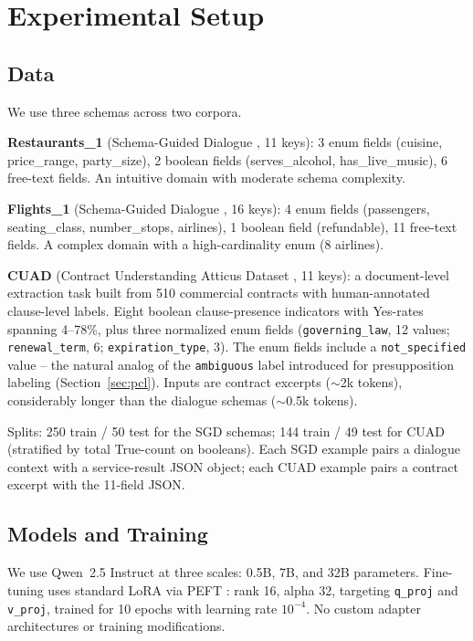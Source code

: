 \documentclass{article}
\begin{document}
\section{Experimental Setup}

\subsection{Data}

We use three schemas across two corpora.

\textbf{Restaurants\_1} (Schema-Guided Dialogue \cite{rastogi2020sgd}, 11 keys): 3 enum fields (cuisine, price\_range, party\_size), 2 boolean fields (serves\_alcohol, has\_live\_music), 6 free-text fields. An intuitive domain with moderate schema complexity.

\textbf{Flights\_1} (Schema-Guided Dialogue \cite{rastogi2020sgd}, 16 keys): 4 enum fields (passengers, seating\_class, number\_stops, airlines), 1 boolean field (refundable), 11 free-text fields. A complex domain with a high-cardinality enum (8 airlines).

\textbf{CUAD} (Contract Understanding Atticus Dataset \cite{hendrycks2021cuad}, 11 keys): a document-level extraction task built from 510 commercial contracts with human-annotated clause-level labels. Eight boolean clause-presence indicators with Yes-rates spanning 4--78\%, plus three normalized enum fields (\texttt{governing\_law}, 12 values; \texttt{renewal\_term}, 6; \texttt{expiration\_type}, 3). The enum fields include a \texttt{not\_specified} value -- the natural analog of the \texttt{ambiguous} label introduced for presupposition labeling (Section~\ref{sec:pcl}). Inputs are contract excerpts ($\sim$2k tokens), considerably longer than the dialogue schemas ($\sim$0.5k tokens).

Splits: 250 train / 50 test for the SGD schemas; 144 train / 49 test for CUAD (stratified by total True-count on booleans). Each SGD example pairs a dialogue context with a service-result JSON object; each CUAD example pairs a contract excerpt with the 11-field JSON.

\subsection{Models and Training}

We use Qwen~2.5 Instruct at three scales: 0.5B, 7B, and 32B parameters. Fine-tuning uses standard LoRA via PEFT \cite{peft2023}: rank 16, alpha 32, targeting \texttt{q\_proj} and \texttt{v\_proj}, trained for 10 epochs with learning rate $10^{-4}$. No custom adapter architectures or training modifications.
\end{document}
